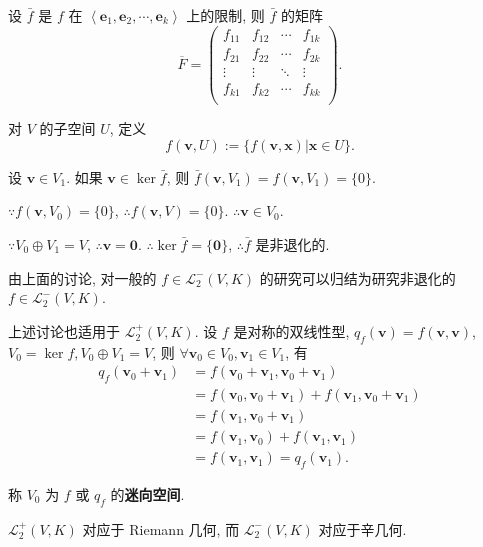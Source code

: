 \documentclass[color=black,device=normal,lang=cn,mode=geye]{elegantnote}
\begin{document}
设 $\bar{f}$ 是 $f$ 在 $\left<\boldsymbol{e}_1,\boldsymbol{e}_2,\cdots,\boldsymbol{e}_k\right>$ 上的限制, 则 $\bar{f}$ 的矩阵
\[\overline{F}=\begin{pmatrix}
    f_{11} & f_{12} & \cdots & f_{1k} \\
    f_{21} & f_{22} & \cdots & f_{2k} \\
    \vdots & \vdots & \ddots & \vdots \\
    f_{k1} & f_{k2} & \cdots & f_{kk} \\
\end{pmatrix}.\]

对 $V$ 的子空间 $U$, 定义
\[f(\boldsymbol{v},U):=\{f(\boldsymbol{v},\boldsymbol{x})|\boldsymbol{x}\in U\}.\]

设 $\boldsymbol{v}\in V_1$. 如果 $\boldsymbol{v}\in\ker\bar{f}$, 则 $\bar{f}(\boldsymbol{v},V_1)=f(\boldsymbol{v},V_1)=\{0\}$.

$\because f(\boldsymbol{v},V_0)=\{0\}$, $\therefore f(\boldsymbol{v},V)=\{0\}$. $\therefore\boldsymbol{v}\in V_0$.

$\because V_0\oplus V_1=V$, $\therefore\boldsymbol{v}=\boldsymbol{0}$. $\therefore\ker\bar{f}=\{\boldsymbol{0}\}$, $\therefore\bar{f}$ 是非退化的.

由上面的讨论, 对一般的 $f\in\mathcal{L}_2^-(V,K)$ 的研究可以归结为研究非退化的 $f\in\mathcal{L}_2^-(V,K)$.

上述讨论也适用于 $\mathcal{L}_2^+(V,K)$. 设 $f$ 是对称的双线性型, $q_f(\boldsymbol{v})=f(\boldsymbol{v},\boldsymbol{v})$, $V_0=\ker f,V_0\oplus V_1=V$, 则 $\forall\boldsymbol{v}_0\in V_0,\boldsymbol{v}_1\in V_1$, 有
\begin{align*}
    q_f(\boldsymbol{v}_0+\boldsymbol{v}_1) & =f(\boldsymbol{v}_0+\boldsymbol{v}_1,\boldsymbol{v}_0+\boldsymbol{v}_1) \\
    & =f(\boldsymbol{v}_0,\boldsymbol{v}_0+\boldsymbol{v}_1)+f(\boldsymbol{v}_1,\boldsymbol{v}_0+\boldsymbol{v}_1) \\
    & =f(\boldsymbol{v}_1,\boldsymbol{v}_0+\boldsymbol{v}_1) \\
    & =f(\boldsymbol{v}_1,\boldsymbol{v}_0)+f(\boldsymbol{v}_1,\boldsymbol{v}_1) \\
    & =f(\boldsymbol{v}_1,\boldsymbol{v}_1)=q_f(\boldsymbol{v}_1).
\end{align*}

称 $V_0$ 为 $f$ 或 $q_f$ 的\textbf{迷向空间}.

$\mathcal{L}_2^+(V,K)$ 对应于 Riemann 几何, 而 $\mathcal{L}_2^-(V,K)$ 对应于辛几何.
\end{document}
